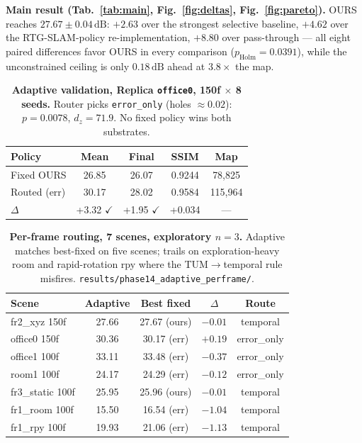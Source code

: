 \documentclass[10pt,twocolumn,letterpaper]{article}
\begin{document}
\textbf{Main result (Tab.~\ref{tab:main}, Fig.~\ref{fig:deltas}, Fig.~\ref{fig:pareto}).}
OURS reaches $27.67 \pm 0.04\,\mathrm{dB}$: $+2.63$ over the strongest selective baseline, $+4.62$ over the RTG-SLAM-policy re-implementation, $+8.80$ over pass-through --- all eight paired differences favor OURS in every comparison ($p_{\mathrm{Holm}} = 0.0391$), while the unconstrained ceiling is only $0.18\,\mathrm{dB}$ ahead at $3.8\times$ the map.

\begin{table}[tbp]
\centering
\footnotesize\setlength{\tabcolsep}{3pt}
\begin{tabular}{lcccc}
\toprule
\textbf{Policy} & \textbf{Mean} & \textbf{Final} & \textbf{SSIM} & \textbf{Map} \\
\midrule
Fixed OURS & 26.85 & 26.07 & 0.9244 & 78,825 \\
Routed (err) & 30.17 & 28.02 & 0.9584 & 115,964 \\
\midrule
$\Delta$ & +3.32 $\checkmark$ & +1.95 $\checkmark$ & +0.034 & --- \\
\bottomrule
\end{tabular}
\caption{\textbf{Adaptive validation, Replica \texttt{office0}, 150f $\times$ 8 seeds.} Router picks \texttt{error\_only} (holes $\approx 0.02$): $p = 0.0078$, $d_z = 71.9$. No fixed policy wins both substrates.}
\label{tab:adaptive}
\end{table}

\begin{table}[tbp]
\centering
\footnotesize\setlength{\tabcolsep}{3pt}
\begin{tabular}{lcccc}
\toprule
\textbf{Scene} & \textbf{Adaptive} & \textbf{Best fixed} & \textbf{$\Delta$} & \textbf{Route} \\
\midrule
fr2\_xyz 150f & 27.66 & 27.67 (ours) & $-0.01$ & temporal \\
office0 150f & 30.36 & 30.17 (err) & $+0.19$ & error\_only \\
office1 100f & 33.11 & 33.48 (err) & $-0.37$ & error\_only \\
room1 100f & 24.17 & 24.29 (err) & $-0.12$ & error\_only \\
fr3\_static 100f & 25.95 & 25.96 (ours) & $-0.01$ & temporal \\
fr1\_room 100f & 15.50 & 16.54 (err) & $-1.04$ & temporal \\
fr1\_rpy 100f & 19.93 & 21.06 (err) & $-1.13$ & temporal \\
\bottomrule
\end{tabular}
\caption{\textbf{Per-frame routing, 7 scenes, exploratory $n=3$.} Adaptive matches best-fixed on five scenes; trails on exploration-heavy room and rapid-rotation rpy where the TUM$\to$temporal rule misfires. \texttt{results/phase14\_adaptive\_perframe/}.}
\label{tab:routing7}
\end{table}
\end{document}
